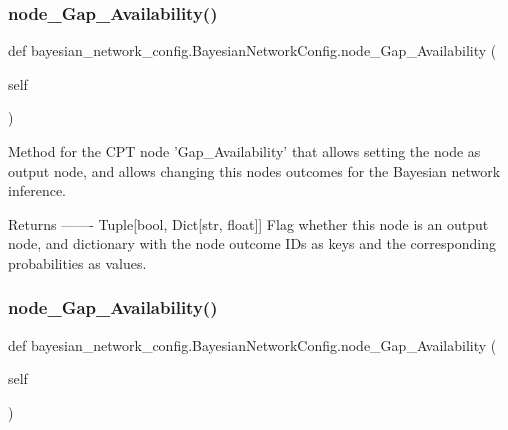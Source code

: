 \subsubsection{\texorpdfstring{node\+\_\+\+Gap\+\_\+\+Availability()}{node\_Gap\_Availability()}\hspace{0.1cm}{\footnotesize\ttfamily [1/2]}}
{\footnotesize\ttfamily def bayesian\+\_\+network\+\_\+config.\+Bayesian\+Network\+Config.\+node\+\_\+\+Gap\+\_\+\+Availability (\begin{DoxyParamCaption}\item[{}]{self }\end{DoxyParamCaption})}

\begin{DoxyVerb}Method for the CPT node 'Gap_Availability' that allows setting the node as output node,
and allows changing this nodes outcomes for the Bayesian network inference.

Returns
-------
Tuple[bool, Dict[str, float]]
    Flag whether this node is an output node, and dictionary with the node outcome IDs as keys
    and the corresponding probabilities as values.
\end{DoxyVerb}
 \mbox{\label{classbayesian__network__config_1_1_bayesian_network_config_a86c973a53f1f78567b32ffa68cea467a}} 
\subsubsection{\texorpdfstring{node\+\_\+\+Gap\+\_\+\+Availability()}{node\_Gap\_Availability()}\hspace{0.1cm}{\footnotesize\ttfamily [2/2]}}
{\footnotesize\ttfamily def bayesian\+\_\+network\+\_\+config.\+Bayesian\+Network\+Config.\+node\+\_\+\+Gap\+\_\+\+Availability (\begin{DoxyParamCaption}\item[{}]{self }\end{DoxyParamCaption})}

